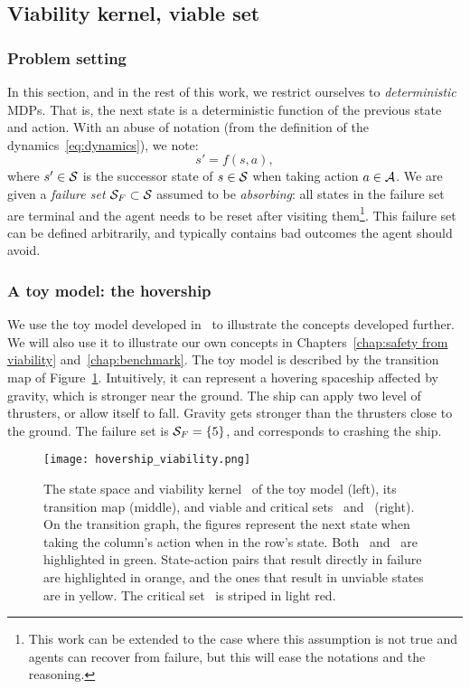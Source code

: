 	\subsection{Viability kernel, viable set}
	\subsubsection{Problem setting}
	In this section, and in the rest of this work, we restrict ourselves to\emph{ deterministic} MDPs. That is, the next state is a deterministic function of the previous state and action. With an abuse of notation (from the definition of the dynamics~\eqref{eq:dynamics}), we note:
	\begin{equation}
		s' = f(s, a),
	\end{equation}
	where $s'\in\S$ is the successor state of $s\in\S$ when taking action $a\in\A$. We are given a\emph{ failure set} $\SF\subset\S$ assumed to be\emph{ absorbing}: all states in the failure set are terminal and the agent needs to be reset after visiting them\footnote{This work can be extended to the case where this assumption is not true and agents can recover from failure, but this will ease the notations and the reasoning.}. This failure set can be defined arbitrarily, and typically contains bad outcomes the agent should avoid.
	\subsubsection{A toy model: the hovership}\label{sec:hovership}
	We use the toy model developed in~\cite{heim2020learnable} to illustrate the concepts developed further. We will also use it to illustrate our own concepts in Chapters~\ref{chap:safety from viability} and~\ref{chap:benchmark}. The toy model is described by the transition map of Figure~\ref{fig:hovership}. Intuitively, it  can represent a hovering spaceship affected by gravity, which is stronger near the ground. The ship can apply two level of thrusters, or allow itself to fall. Gravity gets stronger than the thrusters close to the ground. The failure set is $\SF = \{5\}$, and corresponds to crashing the ship.
	\begin{figure}
		\centering
		\texttt{[image: hovership\_viability.png]}
		\caption{The state space and viability kernel \SV~of the toy model (left), its transition map (middle), and viable and critical sets \QV~and \QC~(right). On the transition graph, the figures represent the next state when taking the column's action when in the row's state. Both \QV~and \SV~are highlighted in green. State-action pairs that result directly in failure are highlighted in orange, and the ones that result in unviable states are in yellow. The critical set \QC~is striped in light red. }
		\label{fig:hovership}
	\end{figure}
